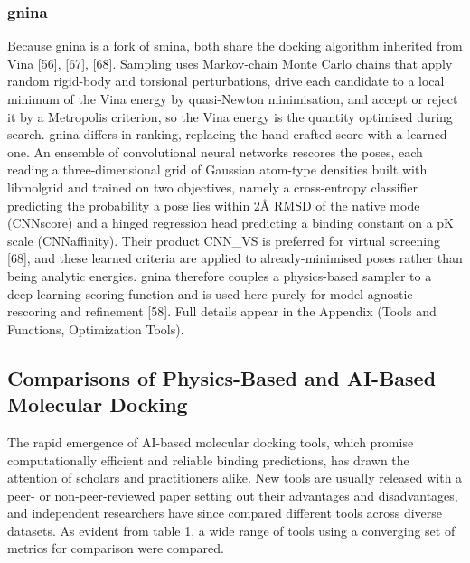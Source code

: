 \hypertarget{gnina}{%
\subsubsection{gnina}\label{gnina}}

Because gnina is a fork of smina, both share the docking algorithm inherited from Vina {[}56{]}, {[}67{]}, {[}68{]}. Sampling uses Markov-chain Monte Carlo chains that apply random rigid-body and torsional perturbations, drive each candidate to a local minimum of the Vina energy by quasi-Newton minimisation, and accept or reject it by a Metropolis criterion, so the Vina energy is the quantity optimised during search. gnina differs in ranking, replacing the hand-crafted score with a learned one. An ensemble of convolutional neural networks rescores the poses, each reading a three-dimensional grid of Gaussian atom-type densities built with libmolgrid and trained on two objectives, namely a cross-entropy classifier predicting the probability a pose lies within 2Å RMSD of the native mode (CNNscore) and a hinged regression head predicting a binding constant on a pK scale (CNNaffinity). Their product CNN\_VS is preferred for virtual screening {[}68{]}, and these learned criteria are applied to already-minimised poses rather than being analytic energies. gnina therefore couples a physics-based sampler to a deep-learning scoring function and is used here purely for model-agnostic rescoring and refinement {[}58{]}. Full details appear in the Appendix (Tools and Functions, Optimization Tools).

\hypertarget{comparisons-of-physics-based-and-ai-based-molecular-docking}{%
\subsection{Comparisons of Physics-Based and AI-Based Molecular Docking}\label{comparisons-of-physics-based-and-ai-based-molecular-docking}}

The rapid emergence of AI-based molecular docking tools, which promise computationally efficient and reliable binding predictions, has drawn the attention of scholars and practitioners alike. New tools are usually released with a peer- or non-peer-reviewed paper setting out their advantages and disadvantages, and independent researchers have since compared different tools across diverse datasets. As evident from table 1, a wide range of tools using a converging set of metrics for comparison were compared.

